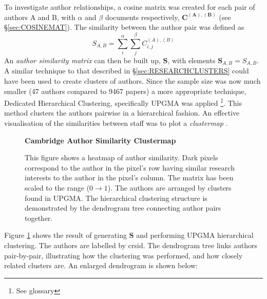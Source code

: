 To investigate author relationships, a cosine matrix was created for each pair of authors A and B, with $\alpha$ and $\beta$ documents respectively, $\mathbf{C^{\left( A \right ) , \left( B \right)}}$ (see \S\ref{sec:COSINEMAT}). The similarity between the author pair was defined as 
$$S_{A , B} = \sum_{i}^{\alpha} \sum_{j}^{\beta} C^{\left( A \right) , \left( B \right) }_{ i , j }$$
An \emph{author similarity matrix} can then be built up, $\mathbf{S}$, with elements $\mathbf{S}_{ A , B }=S_{ A , B }$.
A similar technique to that described in  \S\ref{sec:RESEARCHCLUSTERS} could have been used to create clusters of authors. Since the sample size was now much smaller (47 authors compared to 9467 papers) a more appropriate technique, Dedicated Hierarchical Clustering, specifically UPGMA was applied \cite{heatmapcluster} \footnote{See glossary}. This method clusters the authors pairwise in a hierarchical fashion.  An effective visualisation of the similarities between staff was to plot a \emph{clustermap} \cite{seaborn} \cite{scipy}.
\begin{center}
\begin{figure}[H]
  \centering
  \textbf{Cambridge Author Similarity Clustermap}
    \caption[Cambrdige Author Similarity Clustermap]{This figure shows a heatmap of author similarity. Dark pixels correspond to the author in the pixel's row having similar research interests to the author in the pixel's column. The matrix has been scaled to the range ($0 \rightarrow 1$).  The authors are arranged by clusters found in UPGMA. The hierarchical clustering structure is demonstrated by the dendrogram tree connecting author pairs together.}
    \label{fig:AUTHORSIMS}

\end{figure} 
\end{center}
Figure \ref{fig:AUTHORSIMS} shows the result of generating $\textbf{S}$ and performing UPGMA hierarchical clustering. The authors are labelled by crsid. The dendrogram tree links authors pair-by-pair, illustrating how the clustering was performed, and how closely related clusters are. An enlarged dendrogram is shown below:
